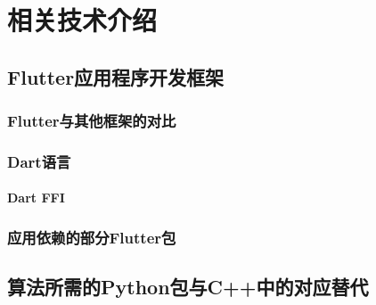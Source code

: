 \chapter{相关技术介绍}\label{ch:tech}


\section{Flutter应用程序开发框架}\label{sec:flutter}


\subsection{Flutter与其他框架的对比}\label{subsec:flutter-compare}


\subsection{Dart语言}\label{subsec:dart}



\subsubsection{Dart FFI}\label{subsubsec:ffi}


\subsection{应用依赖的部分Flutter包}\label{subsec:flutter-packages}



\section{算法所需的Python包与C++中的对应替代}\label{sec:python-cpp-packages}
